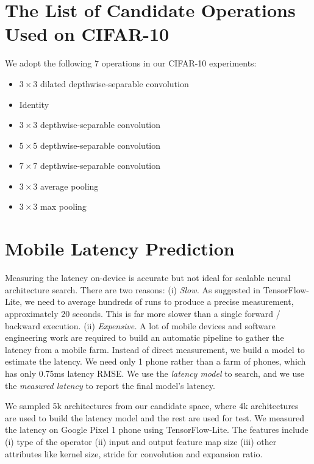 \documentclass{article} \usepackage{iclr2019_conference,times}
\begin{document}



\newpage

\appendix
\section{The List of Candidate Operations Used on CIFAR-10}
We adopt the following $7$ operations in our CIFAR-10 experiments:
{\small
\begin{itemize}
	\setlength\itemsep{0.pt}
	\item $3 \times 3$ dilated depthwise-separable convolution
	\item Identity
	\item $3 \times 3$ depthwise-separable convolution 
	\item $5 \times 5$ depthwise-separable convolution
	\item $7 \times 7$ depthwise-separable convolution
    \item $3 \times 3$ average pooling
    \item $3 \times 3$ max pooling
\end{itemize}
}

\section{Mobile Latency Prediction}\label{sec:latency_prediction_model}
Measuring the latency on-device is accurate but not ideal for scalable neural architecture search. There are two reasons: (i) \emph{Slow.} As suggested in TensorFlow-Lite, 
we need to average hundreds of runs to produce a precise measurement, approximately 20 seconds. This is far more slower than a single forward / backward execution. (ii) \emph{Expensive.} A lot of mobile devices and software engineering work are required to build an automatic pipeline to gather the latency from a mobile farm. Instead of direct measurement, we build a model to estimate the latency. We need only 1 phone rather than a farm of phones, which has only 0.75ms latency RMSE. We use the \emph{latency model} to search, and we use the \emph{measured latency} to report the final model's latency. 

We sampled 5k architectures from our candidate space, where 4k architectures are used to build the latency model and the rest are used for test. We measured the latency on Google Pixel 1 phone using TensorFlow-Lite. The features include (i) type of the operator (ii) input and output feature map size (iii) other attributes like kernel size, stride for convolution and expansion ratio. 
\end{document}
